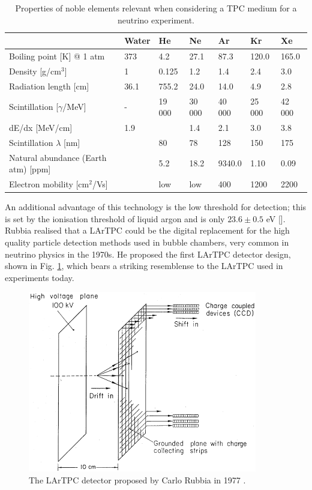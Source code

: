 \begin{table}[ht]
  \caption{Properties of noble elements relevant when considering a TPC medium for a neutrino experiment.}
  \label{tab:NobleProperties}
  \centering
  \begin{tabular}{ m{5cm} || m{1.5cm} | m{1.5cm} | m{1.5cm} | m{1.5cm} | m{1.5cm} | m{1.5cm} }
     & Water & He & Ne & \color{red} Ar & Kr & Xe \\
    \hline\hline
    Boiling point [K] @ 1 atm & 373 & 4.2 & 27.1 & \color{red} 87.3 & 120.0 & 165.0 \\
    \hline
    Density [g/cm$^3$] & 1 & 0.125 & 1.2 & \color{red} 1.4 & 2.4 & 3.0 \\
    \hline
    Radiation length [cm] & 36.1 & 755.2 & 24.0 & \color{red} 14.0 & 4.9 & 2.8 \\
    \hline
    Scintillation [$\gamma$/MeV] & - & 19 000 & 30 000 & \color{red} 40 000 & 25 000 & 42 000 \\
    \hline
    dE/dx [MeV/cm] & 1.9 & & 1.4 & \color{red} 2.1 & 3.0 & 3.8 \\
    \hline
    Scintillation $\lambda$ [nm] & & 80 & 78 & \color{red} 128 & 150 & 175 \\
    \hline
    Natural abundance (Earth atm) [ppm] & & 5.2 & 18.2 & \color{red} 9340.0 & 1.10 & 0.09 \\
    \hline
    Electron mobility [cm$^2$/Vs] & & low & low & \color{red} 400 & 1200 & 2200 \\
    \hline\hline
  \end{tabular}
\end{table}

An additional advantage of this technology is the low threshold for detection; this is set by the ionisation threshold of liquid argon and is only $23.6 \pm 0.5$ eV [].  Rubbia realised that a LArTPC could be the digital replacement for the high quality particle detection methods used in bubble chambers, very common in neutrino physics in the 1970s.  He proposed the first LArTPC detector design, shown in Fig. \ref{fig:RubbiaLArTPC}, which bears a striking resemblense to the LArTPC used in experiments today.

\begin{figure}[ht]
  \centering
  \includegraphics[width=10cm]{RubbiaLArTPC.png}
  \caption[First LArTPC detector, Rubbia (1977)]{The LArTPC detector proposed by Carlo Rubbia in 1977 \cite{Rubbia1977}.}
  \label{fig:RubbiaLArTPC}
\end{figure}

